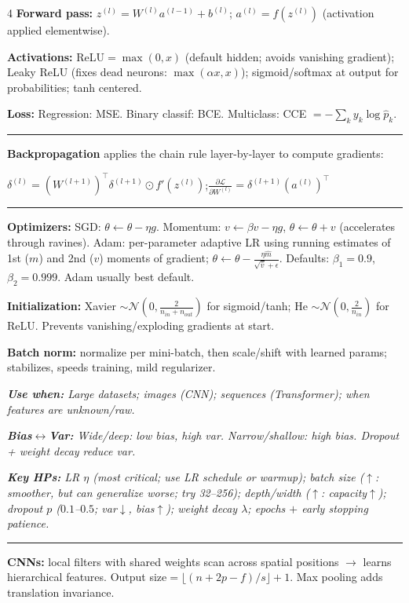 \documentclass[6.5pt,landscape]{article}
\makeatletter
\renewcommand{\section}{\@startsection{section}{1}{\z@}{0.3ex plus 0.05ex}{0.05ex}{\normalfont\scriptsize\bfseries\itshape}}
\newcommand{\rl}{\vspace{-1.5pt}\par\noindent\rule{\columnwidth}{0.15pt}\par\vspace{-1pt}}
\newcommand{\use}[1]{\textit{\textbf{Use when:} #1}}
\newcommand{\bv}[1]{\textit{\textbf{Bias$\leftrightarrow$Var:} #1}}
\newcommand{\hp}[1]{\textit{\textbf{Key HPs:} #1}}
\makeatother
\begin{document}
\begin{multicols*}{4}
\section{Neural Networks}
\noindent\textbf{Forward pass:} $z^{(l)}=W^{(l)}a^{(l-1)}+b^{(l)}$; $a^{(l)}=f(z^{(l)})$ (activation applied elementwise).\par
\textbf{Activations:} ReLU$=\max(0,x)$ (default hidden; avoids vanishing gradient); Leaky ReLU (fixes dead neurons: $\max(\alpha x,x)$); sigmoid/softmax at output for probabilities; tanh centered.\par
\textbf{Loss:} Regression: MSE. Binary classif: BCE. Multiclass: CCE $=-\sum_k y_k\log\hat{p}_k$.\par
\rl
\noindent\textbf{Backpropagation} applies the chain rule layer-by-layer to compute gradients:\par
$\delta^{(l)}=(W^{(l+1)})^\top\delta^{(l+1)}\odot f'(z^{(l)})$;\quad $\frac{\partial\mathcal{L}}{\partial W^{(l)}}=\delta^{(l+1)}(a^{(l)})^\top$\par
\rl
\noindent\textbf{Optimizers:} SGD: $\theta\leftarrow\theta-\eta g$. Momentum: $v\leftarrow\beta v-\eta g$, $\theta\leftarrow\theta+v$ (accelerates through ravines). Adam: per-parameter adaptive LR using running estimates of 1st ($m$) and 2nd ($v$) moments of gradient; $\theta\leftarrow\theta-\frac{\eta\hat{m}}{\sqrt{\hat{v}}+\epsilon}$. Defaults: $\beta_1{=}0.9$, $\beta_2{=}0.999$. Adam usually best default.\par
\textbf{Initialization:} Xavier $\sim\mathcal{N}(0,\frac{2}{n_{in}+n_{out}})$ for sigmoid/tanh; He $\sim\mathcal{N}(0,\frac{2}{n_{in}})$ for ReLU. Prevents vanishing/exploding gradients at start.\par
\textbf{Batch norm:} normalize per mini-batch, then scale/shift with learned params; stabilizes, speeds training, mild regularizer.\par
\use{Large datasets; images (CNN); sequences (Transformer); when features are unknown/raw.}\par
\bv{Wide/deep: low bias, high var. Narrow/shallow: high bias. Dropout + weight decay reduce var.}\par
\hp{LR $\eta$ (most critical; use LR schedule or warmup); batch size ($\uparrow$: smoother, but can generalize worse; try 32--256); depth/width ($\uparrow$: capacity$\uparrow$); dropout $p$ ($0.1$--$0.5$; var$\downarrow$, bias$\uparrow$); weight decay $\lambda$; epochs $+$ early stopping patience.}\par
\rl
\noindent\textbf{CNNs:} local filters with shared weights scan across spatial positions $\to$ learns hierarchical features. Output size$=\lfloor(n+2p-f)/s\rfloor+1$. Max pooling adds translation invariance.\par

\end{multicols*}
\end{document}

